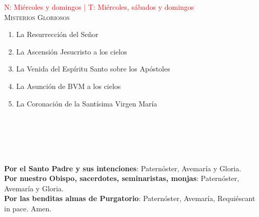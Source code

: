 \documentclass[9pt]{article}
\begin{document}
\begin{multicols*}{2}
    \vspace{2mm}

    \small{\textcolor{red}{N: Miércoles y domingos | T: Miércoles, sábados y domingos}}\\
    \textsc{Misterios Gloriosos}
    \begin{enumerate}
        \item La Resurrección del Señor
        \item La Ascensión Jesucristo a los cielos
        \item La Venida del Espíritu Santo sobre los Apóstoles
        \item La Asunción de BVM a los cielos
        \item La Coronación de la Santísima Virgen María
    \end{enumerate}

    \vspace{2mm}

    \\[1mm]
    \\[1mm]
    \\[1mm]
    

    \vspace{2mm}

    \\

    \textbf{Por el Santo Padre y sus intenciones}: Paternóster, Avemaría y Gloria.\\[1mm]
    \textbf{Por nuestro Obispo, sacerdotes, seminaristas, monjas}: Paternóster, Avemaría y Gloria.\\[1mm]
    \textbf{Por las benditas almas de Purgatorio}: Paternóster, Avemaría, Requiéscant in pace. Amen.\\

    \\
    \\
    \\
    \\[2mm]
    \\
    \\[1mm]
    \\[1mm]
    


    \\
    \\
    \\
    

\end{multicols*}
\end{document}
